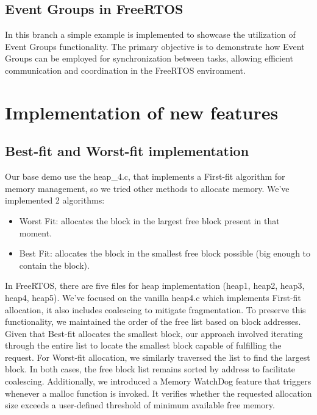 \subsection{Event Groups in FreeRTOS}%
In this branch a simple example is implemented to showcase the utilization of Event Groups functionality.
The primary objective is to demonstrate how Event Groups can be employed for synchronization between tasks, allowing efficient communication and coordination in the FreeRTOS environment.



\section{Implementation of new features}

\subsection{Best-fit and Worst-fit implementation}
Our base demo use the heap\_4.c, that implements a First-fit algorithm for memory management, so we tried other methods to allocate memory. We've implemented 2 algorithms:
\begin{itemize}
    \item Worst Fit: allocates the block in the largest free block present in that moment.
    \item Best Fit: allocates the block in the smallest free block possible (big enough to contain the block).
\end{itemize}
In FreeRTOS, there are five files for heap implementation (heap1, heap2, heap3, heap4, heap5). We've focused on the vanilla heap4.c which implements First-fit allocation, it also includes coalescing to mitigate fragmentation. To preserve this functionality, we maintained the order of the free list based on block addresses.
Given that Best-fit allocates the smallest block, our approach involved iterating through the entire list to locate the smallest block capable of fulfilling the request. For Worst-fit allocation, we similarly traversed the list to find the largest block. In both cases, the free block list remains sorted by address to facilitate coalescing.
Additionally, we introduced a Memory WatchDog feature that triggers whenever a malloc function is invoked. It verifies whether the requested allocation size exceeds a user-defined threshold of minimum available free memory.

